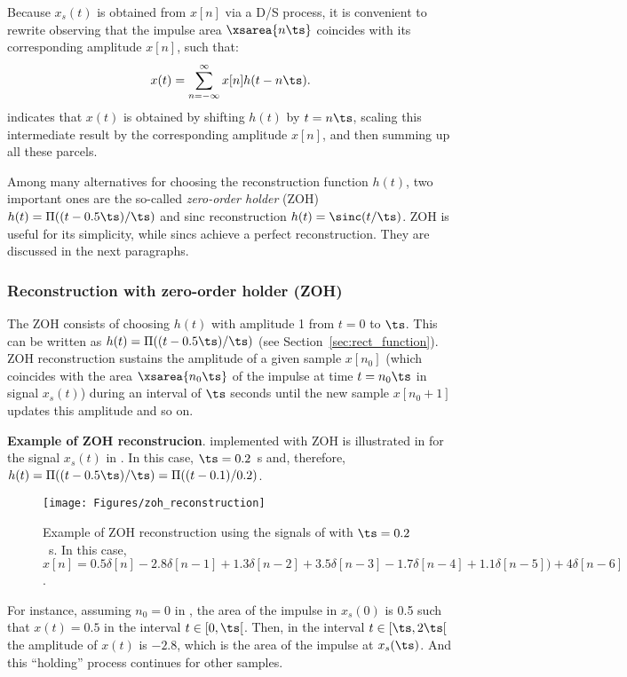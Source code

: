 Because $x_s(t)$ is obtained from $x[n]$ via a D/S process, it is convenient to rewrite  observing that the impulse area $\xsarea{{n \ts}}$ coincides with its corresponding amplitude $x[n]$, such that:
\begin{equation}
x(t) = \sum_{n=-\infty}^{\infty} x[n] h(t - n \ts).
\label{eq:reconstruction}
\end{equation}
 indicates that $x(t)$ is obtained by shifting $h(t)$ by $t=n \ts$, scaling this intermediate result by the corresponding amplitude $x[n]$, and then summing up all these parcels.

Among many alternatives for choosing the reconstruction function $h(t)$, two important ones are the so-called \emph{zero-order holder} (ZOH) $h(t)=\Pi( (t-0.5\ts)/\ts)$ and sinc reconstruction $h(t)=\sinc(t/\ts)$. ZOH is useful for its simplicity, while sincs achieve a perfect reconstruction. They are discussed in the next paragraphs.

\subsubsection{Reconstruction with zero-order holder (ZOH)}

The ZOH consists of choosing $h(t)$ with amplitude 1 from $t=0$ to $\ts$. This can be written as 
$h(t)=\Pi( (t-0.5\ts)/\ts)$ (see Section~\ref{sec:rect_function}).
ZOH reconstruction sustains the amplitude of a given sample $x[n_0]$ (which coincides with the area $\xsarea{{n_0 \ts}}$ of the impulse at time $t=n_0 \ts$ in signal $x_s(t)$) during an interval of $\ts$ seconds until the new sample $x[n_0+1]$ updates this amplitude and so on.

\bExample \textbf{Example of ZOH reconstrucion}.
 implemented with ZOH is illustrated in  for the signal $x_s(t)$ in . In this case, $\ts=0.2$~s and, therefore, $h(t)=\Pi( (t-0.5\ts)/\ts) = \Pi( (t-0.1)/0.2)$.

\begin{figure}
	\centering
		\texttt{[image: Figures/zoh\_reconstruction]}
	\caption{Example of ZOH reconstruction using the signals of  with $\ts=0.2$~s. In this case, $x[n] = 0.5\delta[n] -2.8\delta[n-1] + 1.3\delta[n-2]+ 3.5\delta[n-3] -1.7\delta[n-4] + 1.1\delta[n-5]) + 4\delta[n-6]$.\label{fig:zoh_reconstruction}}
\end{figure}

For instance, assuming $n_0=0$ in , the area of the impulse in $x_s(0)$ is 0.5 such that $x(t)=0.5$ in the interval $t \in [0, \ts[$. Then, in the interval $t \in [\ts, 2 \ts[$ the amplitude of $x(t)$ is $-2.8$, which is the area of the impulse at $x_s(\ts)$. And this ``holding'' process continues for other samples.
\eExample 


